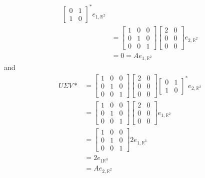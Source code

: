 \documentclass[12pt]{article}
\newenvironment{sol}[1][Solution]{\begin{trivlist}
		\item[\hskip \labelsep {\bfseries #1:}]}{\end{trivlist}}
\begin{document}
\begin{sol}
\begin{enumerate}[label=(\alph*)]
\begin{align*}
			\begin{bmatrix}
				0 & 1\\
				1 & 0
			\end{bmatrix}^*
			e_{1,\mathbb{R}^2}\\
			&=\begin{bmatrix}
				1 & 0 & 0\\
				0 & 1 & 0\\
				0 & 0 & 1
			\end{bmatrix}
			\begin{bmatrix}
				2 & 0\\
				0 & 0\\
				0 & 0
			\end{bmatrix}e_{2,\mathbb{R}^2}\\
			&=0=Ae_{1,\mathbb{R}^2}
		\end{align*}
		and
		\begin{align*}
			U\Sigma V*&=\begin{bmatrix}
				1 & 0 & 0\\
				0 & 1 & 0\\
				0 & 0 & 1
			\end{bmatrix}
			\begin{bmatrix}
				2 & 0\\
				0 & 0\\
				0 & 0
			\end{bmatrix}
			\begin{bmatrix}
				0 & 1\\
				1 & 0
			\end{bmatrix}^*
			e_{2,\mathbb{R}^2}\\
			&=\begin{bmatrix}
				1 & 0 & 0\\
				0 & 1 & 0\\
				0 & 0 & 1
			\end{bmatrix}
			\begin{bmatrix}
				2 & 0\\
				0 & 0\\
				0 & 0
			\end{bmatrix}
			e_{1,\mathbb{R}^2}\\
			&=\begin{bmatrix}
				1 & 0 & 0\\
				0 & 1 & 0\\
				0 & 0 & 1
			\end{bmatrix}
			2e_{1,\mathbb{R}^3}\\
			&=2e_{1\mathbb{R}^3}\\
			&=Ae_{2,\mathbb{R}^2}
		\end{align*}

\end{enumerate}
\end{sol}
\end{document}
